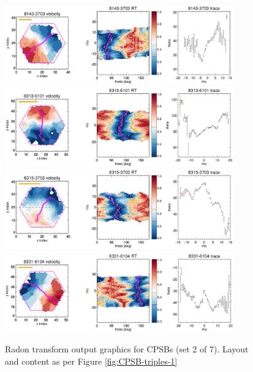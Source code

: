 \documentclass[fleqn,usenatbib]{mnras}
\begin{document}
\begin{figure}
    \centering
    \includegraphics[width=0.88\textwidth]{Images/SN1-MC250/CPSB-triples/CPSB-8143-3703-1-250.png}
    \includegraphics[width=0.88\textwidth]{Images/SN1-MC250/CPSB-triples/CPSB-8313-6101-1-250.png}
    \includegraphics[width=0.88\textwidth]{Images/SN1-MC250/CPSB-triples/CPSB-8315-3703-1-250.png}
    \includegraphics[width=0.88\textwidth]{Images/SN1-MC250/CPSB-triples/CPSB-8331-6104-1-250.png}    
    \caption{Radon transform output graphics for CPSBs (set 2 of 7). Layout and content as per Figure \ref{fig:CPSB-triples-1}}
    \label{fig:CPSB-triples-2}
\end{figure}
\end{document}
